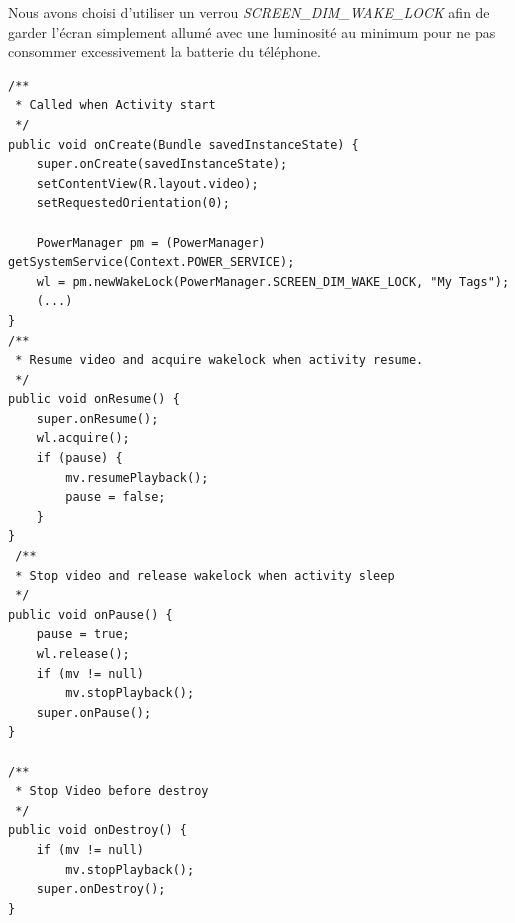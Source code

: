 Nous avons choisi d'utiliser un verrou \textit{SCREEN\_DIM\_WAKE\_LOCK} afin de
garder l'écran simplement allumé avec une luminosité au minimum pour ne pas consommer
excessivement la batterie du téléphone.
\newpage
 \begin{lstlisting}[caption={Video life-cycle}] 
/**
 * Called when Activity start
 */
public void onCreate(Bundle savedInstanceState) {
	super.onCreate(savedInstanceState);
	setContentView(R.layout.video);
	setRequestedOrientation(0);
	
	PowerManager pm = (PowerManager) getSystemService(Context.POWER_SERVICE);
	wl = pm.newWakeLock(PowerManager.SCREEN_DIM_WAKE_LOCK, "My Tags");
	(...)
}
/**
 * Resume video and acquire wakelock when activity resume.
 */
public void onResume() {
	super.onResume();
	wl.acquire();
	if (pause) {
	    mv.resumePlayback();
	    pause = false;
	}
}
 /**
 * Stop video and release wakelock when activity sleep
 */
public void onPause() {
	pause = true;
	wl.release();
	if (mv != null)
	    mv.stopPlayback();
	super.onPause();
}

/**
 * Stop Video before destroy
 */
public void onDestroy() {
	if (mv != null)
	    mv.stopPlayback();
	super.onDestroy();
}
\end{lstlisting}
